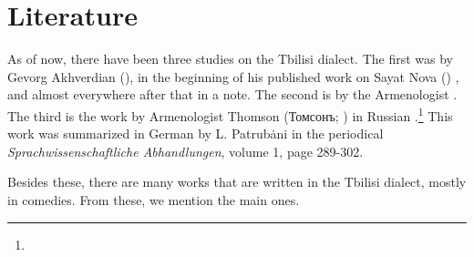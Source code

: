 \section{Literature}


As of now, there have been three studies on the Tbilisi dialect. The first was by Gevorg Akhverdian (), in the beginning of his published work on Sayat Nova () \citep[1-41]{SayatNova}, and almost everywhere after that in a note. The second is by the Armenologist \citet{Petermann-1867-Tiflis}. The third is the work by Armenologist Thomson (Томсонъ; ) in Russian \citep{Thomson-1890-Tiflis}.\footnote{} This work was summarized in German by L. Patrubȧni in the periodical \textit{Sprachwissenschaftliche Abhandlungen}, volume 1, page 289-302.

Besides these, there are many works that are written in the Tbilisi dialect, mostly in comedies. From these, we mention the main ones.


\begin{adjarianpage}\label{page:58}\end{adjarianpage}%

{\litoverview}

